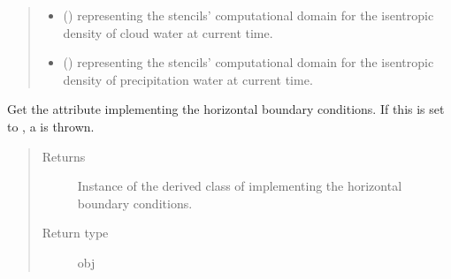 \documentclass[letterpaper,10pt,english]{sphinxmanual}
\begin{document}
\begin{fulllineitems}
\begin{fulllineitems}
\begin{quote}
\begin{description}
\begin{itemize}
\item {} 
 () \textendash{}  representing the stencils’ computational domain for the isentropic density
of cloud water at current time.

\item {} 
 () \textendash{}  representing the stencils’ computational domain for the isentropic density
of precipitation water at current time.

\end{itemize}

\end{description}\end{quote}

\end{fulllineitems}


\begin{fulllineitems}
\label{\detokenize{api:dycore.prognostic_isentropic.PrognosticIsentropic.boundary}}
Get the attribute implementing the horizontal boundary conditions.
If this is set to , a  is thrown.
\begin{quote}\begin{description}
\item[{Returns}] \leavevmode
Instance of the derived class of {\hyperref[\detokenize{api:dycore.horizontal_boundary.HorizontalBoundary}]{}} implementing
the horizontal boundary conditions.

\item[{Return type}] \leavevmode
obj

\end{description}\end{quote}

\end{fulllineitems}



\end{fulllineitems}
\end{document}
